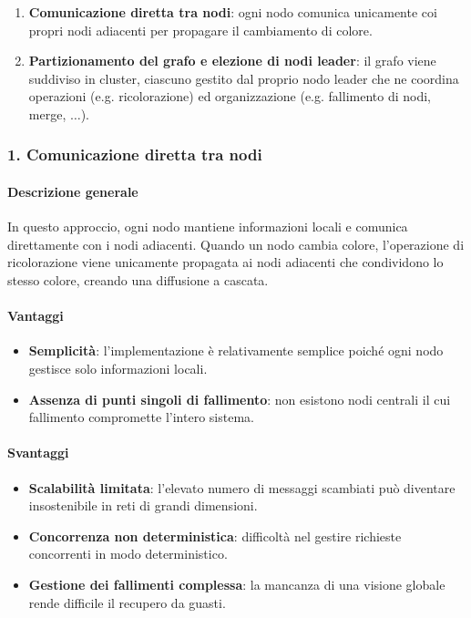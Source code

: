 \documentclass[12pt, a4paper]{report}
\begin{document}
\begin{enumerate}
    \item \textbf{Comunicazione diretta tra nodi}: ogni nodo comunica unicamente coi propri nodi adiacenti per propagare il cambiamento di colore.
    \item \textbf{Partizionamento del grafo e elezione di nodi leader}: il grafo viene suddiviso in cluster, ciascuno gestito dal proprio nodo leader che ne coordina operazioni (e.g. ricolorazione) ed organizzazione (e.g. fallimento di nodi, merge, $\ldots$).
\end{enumerate}

\subsubsection{1. Comunicazione diretta tra nodi}

\paragraph{Descrizione generale}
\begin{flushleft}
In questo approccio, ogni nodo mantiene informazioni locali e comunica direttamente con i nodi adiacenti. Quando un nodo cambia colore, l'operazione di ricolorazione viene unicamente propagata ai nodi adiacenti che condividono lo stesso colore, creando una diffusione a cascata.
\end{flushleft}

\paragraph{Vantaggi}

\begin{itemize}
    \item \textbf{Semplicit\`a}: l'implementazione \`e relativamente semplice poich\'e ogni nodo gestisce solo informazioni locali.
    \item \textbf{Assenza di punti singoli di fallimento}: non esistono nodi centrali il cui fallimento compromette l'intero sistema.
\end{itemize}

\paragraph{Svantaggi}

\begin{itemize}
    \item \textbf{Scalabilit\`a limitata}: l'elevato numero di messaggi scambiati pu\`o diventare insostenibile in reti di grandi dimensioni.
    \item \textbf{Concorrenza non deterministica}: difficolt\`a nel gestire richieste concorrenti in modo deterministico.
    \item \textbf{Gestione dei fallimenti complessa}: la mancanza di una visione globale rende difficile il recupero da guasti.
\end{itemize}
\end{document}
